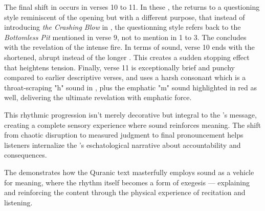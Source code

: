 The final shift in   occurs in verses 10 to 11. In these  , the   returns to a questioning style reminiscent of the opening  \newline but with a different purpose, that instead of introducing \textit{the Crashing Blow} in  , the questionning style refers back to   the \textit{Bottomless Pit} mentioned in verse 9, not to   mention in   1 to 3. The   concludes with the revelation of the intense fire. In terms of sound, verse 10 ends with the shortened, abrupt   instead of the longer  . This creates a sudden stopping effect that heightens tension. Finally, verse 11   is exceptionally brief and punchy compared to earlier descriptive verses, and uses a harsh consonant  which is a throat-scraping "h" sound in  , plus the emphatic "m" sound highlighted in red as well, delivering the ultimate revelation with emphatic force.

This rhythmic progression isn't merely decorative but integral to the 's \newline message, creating a complete sensory experience where sound reinforces meaning. The shift from chaotic disruption to measured judgment to final pronouncement helps listeners internalize the 's  eschatological narrative about accountability and consequences.

The   demonstrates how the Quranic text masterfully employs sound as a vehicle for meaning, where the rhythm itself becomes a form of exegesis --- explaining and reinforcing the content through the physical experience of recitation and listening.

